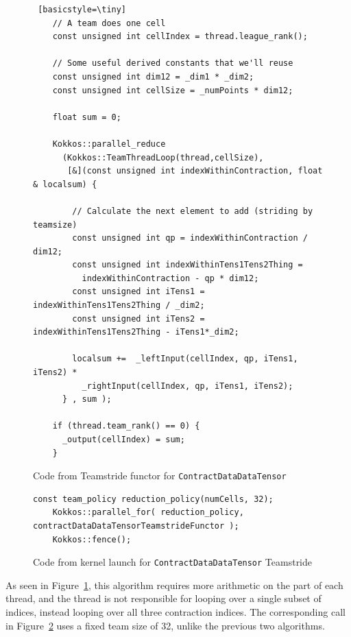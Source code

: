 \begin{figure}[ht]
    \begin{lstlisting} [basicstyle=\tiny]
    // A team does one cell
    const unsigned int cellIndex = thread.league_rank();

    // Some useful derived constants that we'll reuse
    const unsigned int dim12 = _dim1 * _dim2;
    const unsigned int cellSize = _numPoints * dim12;

    float sum = 0;

    Kokkos::parallel_reduce
      (Kokkos::TeamThreadLoop(thread,cellSize),
       [&](const unsigned int indexWithinContraction, float & localsum) {

        // Calculate the next element to add (striding by teamsize)
        const unsigned int qp = indexWithinContraction / dim12;
        const unsigned int indexWithinTens1Tens2Thing =
          indexWithinContraction - qp * dim12;
        const unsigned int iTens1 = indexWithinTens1Tens2Thing / _dim2;
        const unsigned int iTens2 = indexWithinTens1Tens2Thing - iTens1*_dim2;

        localsum +=  _leftInput(cellIndex, qp, iTens1, iTens2) *
          _rightInput(cellIndex, qp, iTens1, iTens2);
      } , sum );

    if (thread.team_rank() == 0) {
      _output(cellIndex) = sum;
    }
    \end{lstlisting}

\caption{Code from Teamstride functor for \texttt{ContractDataDataTensor}
\label{lst:ContractDataDataTensorTeamstrideFunctor}} 
\end{figure}

\begin{figure}[ht]
    \begin{lstlisting}[basicstyle=\tiny]
    const team_policy reduction_policy(numCells, 32);
    Kokkos::parallel_for( reduction_policy, contractDataDataTensorTeamstrideFunctor );
    Kokkos::fence();
    \end{lstlisting}
\caption{Code from kernel launch for \texttt{ContractDataDataTensor} Teamstride
\label{lst:ContractDataDataTensorTeamstrideCall}} 
\end{figure}

As seen in Figure~\ref{lst:ContractDataDataTensorTeamstrideFunctor}, this
algorithm requires more arithmetic on the part of each thread, and the thread
is not responsible for looping over a single subset of indices, instead looping
over all three contraction indices. The corresponding call in
Figure~\ref{lst:ContractDataDataTensorTeamstrideCall} uses a fixed team size of
32, unlike the previous two algorithms.

